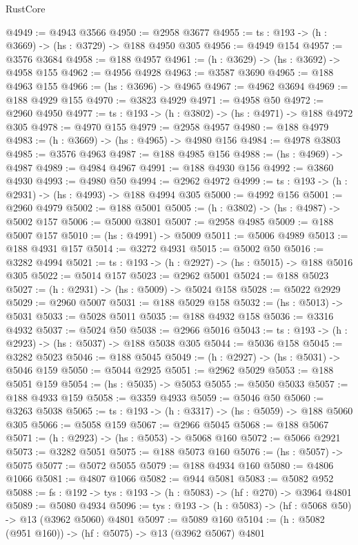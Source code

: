\begin{lexlean}{RustCore}
\begin{coremodule}
@4949 := @4943 @3566
@4950 := @2958 @3677
@4955 := {ts : @193} -> (h : @3669) -> (hs : @3729) -> @188 @4950 @305
@4956 := @4949 @154
@4957 := @3576 @3684
@4958 := @188 @4957
@4961 := (h : @3629) -> (hs : @3692) -> @4958 @155
@4962 := @4956 @4928
@4963 := @3587 @3690
@4965 := @188 @4963 @155
@4966 := (hs : @3696) -> @4965
@4967 := @4962 @3694
@4969 := @188 @4929 @155
@4970 := @3823 @4929
@4971 := @4958 @50
@4972 := @2960 @4950
@4977 := {ts : @193} -> (h : @3802) -> (hs : @4971) -> @188 @4972 @305
@4978 := @4970 @155
@4979 := @2958 @4957
@4980 := @188 @4979
@4983 := (h : @3669) -> (hs : @4965) -> @4980 @156
@4984 := @4978 @3803
@4985 := @3576 @4963
@4987 := @188 @4985 @156
@4988 := (hs : @4969) -> @4987
@4989 := @4984 @4967
@4991 := @188 @4930 @156
@4992 := @3860 @4930
@4993 := @4980 @50
@4994 := @2962 @4972
@4999 := {ts : @193} -> (h : @2931) -> (hs : @4993) -> @188 @4994 @305
@5000 := @4992 @156
@5001 := @2960 @4979
@5002 := @188 @5001
@5005 := (h : @3802) -> (hs : @4987) -> @5002 @157
@5006 := @5000 @3801
@5007 := @2958 @4985
@5009 := @188 @5007 @157
@5010 := (hs : @4991) -> @5009
@5011 := @5006 @4989
@5013 := @188 @4931 @157
@5014 := @3272 @4931
@5015 := @5002 @50
@5016 := @3282 @4994
@5021 := {ts : @193} -> (h : @2927) -> (hs : @5015) -> @188 @5016 @305
@5022 := @5014 @157
@5023 := @2962 @5001
@5024 := @188 @5023
@5027 := (h : @2931) -> (hs : @5009) -> @5024 @158
@5028 := @5022 @2929
@5029 := @2960 @5007
@5031 := @188 @5029 @158
@5032 := (hs : @5013) -> @5031
@5033 := @5028 @5011
@5035 := @188 @4932 @158
@5036 := @3316 @4932
@5037 := @5024 @50
@5038 := @2966 @5016
@5043 := {ts : @193} -> (h : @2923) -> (hs : @5037) -> @188 @5038 @305
@5044 := @5036 @158
@5045 := @3282 @5023
@5046 := @188 @5045
@5049 := (h : @2927) -> (hs : @5031) -> @5046 @159
@5050 := @5044 @2925
@5051 := @2962 @5029
@5053 := @188 @5051 @159
@5054 := (hs : @5035) -> @5053
@5055 := @5050 @5033
@5057 := @188 @4933 @159
@5058 := @3359 @4933
@5059 := @5046 @50
@5060 := @3263 @5038
@5065 := {ts : @193} -> (h : @3317) -> (hs : @5059) -> @188 @5060 @305
@5066 := @5058 @159
@5067 := @2966 @5045
@5068 := @188 @5067
@5071 := (h : @2923) -> (hs : @5053) -> @5068 @160
@5072 := @5066 @2921
@5073 := @3282 @5051
@5075 := @188 @5073 @160
@5076 := (hs : @5057) -> @5075
@5077 := @5072 @5055
@5079 := @188 @4934 @160
@5080 := @4806 @1066
@5081 := @4807 @1066
@5082 := @944 @5081
@5083 := @5082 @952
@5088 := {fs : @192} -> {tys : @193} -> (h : @5083) -> (hf : @270) -> @3964 @4801
@5089 := @5080 @4934
@5096 := {tys : @193} -> (h : @5083) -> (hf : @5068 @50) -> @13 (@3962 @5060) @4801
@5097 := @5089 @160
@5104 := (h : @5082 (@951 @160)) -> (hf : @5075) -> @13 (@3962 @5067) @4801

\end{coremodule}
\end{lexlean}
